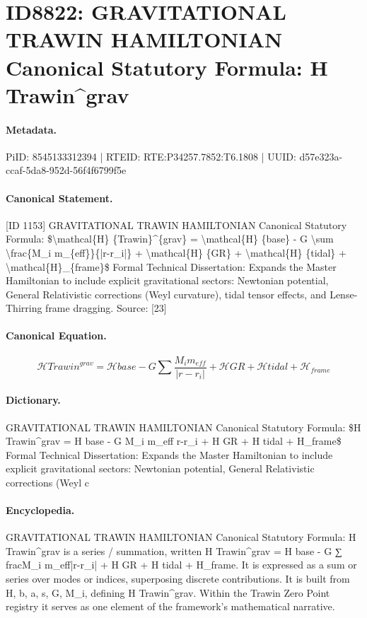 \section*{ID8822: GRAVITATIONAL TRAWIN HAMILTONIAN Canonical Statutory Formula: H Trawin\textasciicircum{}grav}
\paragraph{Metadata.}
PiID: 8545133312394 | RTEID: RTE:P34257.7852:T6.1808 | UUID: d57e323a-ccaf-5da8-952d-56f4f6799f5e

\paragraph{Canonical Statement.}
[ID 1153] GRAVITATIONAL TRAWIN HAMILTONIAN Canonical Statutory Formula: \$\textbackslash{}mathcal\{H\} \{Trawin\}\textasciicircum{}\{grav\} = \textbackslash{}mathcal\{H\} \{base\} - G \textbackslash{}sum \textbackslash{}frac\{M\_i m\_\{eff\}\}\{|r-r\_i|\} + \textbackslash{}mathcal\{H\} \{GR\} + \textbackslash{}mathcal\{H\} \{tidal\} + \textbackslash{}mathcal\{H\}\_\{frame\}\$ Formal Technical Dissertation: Expands the Master Hamiltonian to include explicit gravitational sectors: Newtonian potential, General Relativistic corrections (Weyl curvature), tidal tensor effects, and Lense-Thirring frame dragging. Source: [23]

\paragraph{Canonical Equation.}
\[
\mathcal{H} {Trawin}^{grav} = \mathcal{H} {base} - G \sum \frac{M_i m_{eff}}{|r-r_i|} + \mathcal{H} {GR} + \mathcal{H} {tidal} + \mathcal{H}_{frame}
\]

\paragraph{Dictionary.}
GRAVITATIONAL TRAWIN HAMILTONIAN Canonical Statutory Formula: \$H Trawin\textasciicircum{}grav = H base - G M\_i m\_eff r-r\_i + H GR + H tidal + H\_frame\$ Formal Technical Dissertation: Expands the Master Hamiltonian to include explicit gravitational sectors: Newtonian potential, General Relativistic corrections (Weyl c

\paragraph{Encyclopedia.}
GRAVITATIONAL TRAWIN HAMILTONIAN Canonical Statutory Formula: H Trawin\textasciicircum{}grav is a series / summation, written H Trawin\textasciicircum{}grav = H base - G ∑ fracM\_i m\_eff|r-r\_i| + H GR + H tidal + H\_frame. It is expressed as a sum or series over modes or indices, superposing discrete contributions. It is built from H, b, a, s, G, M\_i, defining H Trawin\textasciicircum{}grav. Within the Trawin Zero Point registry it serves as one element of the framework's mathematical narrative.
